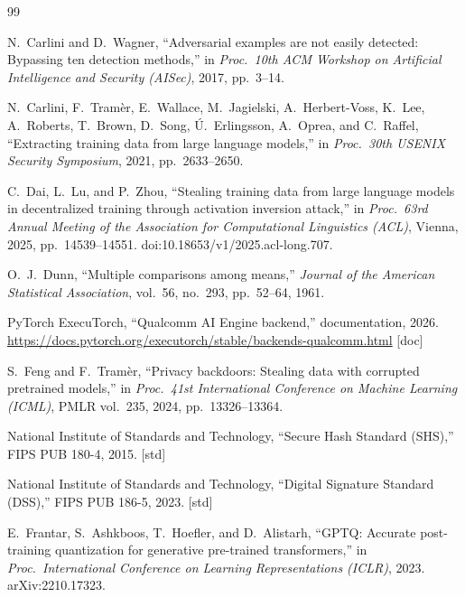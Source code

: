 \begin{thebibliography}{99}
\small

N.~Carlini and D.~Wagner, ``Adversarial examples are not easily detected: Bypassing ten detection
methods,'' in \textit{Proc.\ 10th ACM Workshop on Artificial Intelligence and Security (AISec)},
2017, pp.~3--14.

N.~Carlini, F.~Tram\`er, E.~Wallace, M.~Jagielski, A.~Herbert-Voss, K.~Lee, A.~Roberts, T.~Brown,
D.~Song, \'U.~Erlingsson, A.~Oprea, and C.~Raffel, ``Extracting training data from large language
models,'' in \textit{Proc.\ 30th USENIX Security Symposium}, 2021, pp.~2633--2650.

C.~Dai, L.~Lu, and P.~Zhou, ``Stealing training data from large language models in decentralized
training through activation inversion attack,'' in \textit{Proc.\ 63rd Annual Meeting of the
Association for Computational Linguistics (ACL)}, Vienna, 2025, pp.~14539--14551.
doi:10.18653/v1/2025.acl-long.707.

O.~J.~Dunn, ``Multiple comparisons among means,'' \textit{Journal of the American Statistical
Association}, vol.~56, no.~293, pp.~52--64, 1961.

PyTorch ExecuTorch, ``Qualcomm AI Engine backend,'' documentation, 2026.
\url{https://docs.pytorch.org/executorch/stable/backends-qualcomm.html} [doc]

S.~Feng and F.~Tram\`er, ``Privacy backdoors: Stealing data with corrupted pretrained models,'' in
\textit{Proc.\ 41st International Conference on Machine Learning (ICML)}, PMLR vol.~235, 2024,
pp.~13326--13364.

National Institute of Standards and Technology, ``Secure Hash Standard (SHS),'' FIPS PUB 180-4,
2015. [std]

National Institute of Standards and Technology, ``Digital Signature Standard (DSS),'' FIPS PUB
186-5, 2023. [std]

E.~Frantar, S.~Ashkboos, T.~Hoefler, and D.~Alistarh, ``GPTQ: Accurate post-training quantization
for generative pre-trained transformers,'' in \textit{Proc.\ International Conference on Learning
Representations (ICLR)}, 2023. arXiv:2210.17323.


\end{thebibliography}
